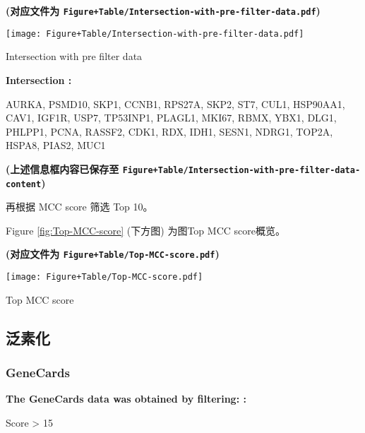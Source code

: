 \documentclass[
]{article}
\begin{document}
\textbf{(对应文件为 \texttt{Figure+Table/Intersection-with-pre-filter-data.pdf})}

\def\@captype{figure}
\begin{center}
\texttt{[image: Figure+Table/Intersection-with-pre-filter-data.pdf]}
\caption{Intersection with pre filter data}\label{fig:Intersection-with-pre-filter-data}
\end{center}
\begin{center}\begin{tcolorbox}[colback=gray!10, colframe=gray!50, width=0.9\linewidth, arc=1mm, boxrule=0.5pt]
\textbf{
Intersection
:}

\vspace{0.5em}

    AURKA, PSMD10, SKP1, CCNB1, RPS27A, SKP2, ST7, CUL1,
HSP90AA1, CAV1, IGF1R, USP7, TP53INP1, PLAGL1, MKI67, RBMX,
YBX1, DLG1, PHLPP1, PCNA, RASSF2, CDK1, RDX, IDH1, SESN1,
NDRG1, TOP2A, HSPA8, PIAS2, MUC1

\vspace{2em}
\end{tcolorbox}
\end{center}

\textbf{(上述信息框内容已保存至 \texttt{Figure+Table/Intersection-with-pre-filter-data-content})}

再根据 MCC score 筛选 Top 10。

Figure \ref{fig:Top-MCC-score} (下方图) 为图Top MCC score概览。

\textbf{(对应文件为 \texttt{Figure+Table/Top-MCC-score.pdf})}

\def\@captype{figure}
\begin{center}
\texttt{[image: Figure+Table/Top-MCC-score.pdf]}
\caption{Top MCC score}\label{fig:Top-MCC-score}
\end{center}

\hypertarget{ux6cdbux7d20ux5316}{%
\subsection{泛素化}\label{ux6cdbux7d20ux5316}}

\hypertarget{genecards-1}{%
\subsubsection{GeneCards}\label{genecards-1}}

\begin{center}\begin{tcolorbox}[colback=gray!10, colframe=gray!50, width=0.9\linewidth, arc=1mm, boxrule=0.5pt]
\textbf{
The GeneCards data was obtained by filtering:
:}

\vspace{0.5em}

    Score > 15

\vspace{2em}
\end{tcolorbox}
\end{center}
\end{document}
